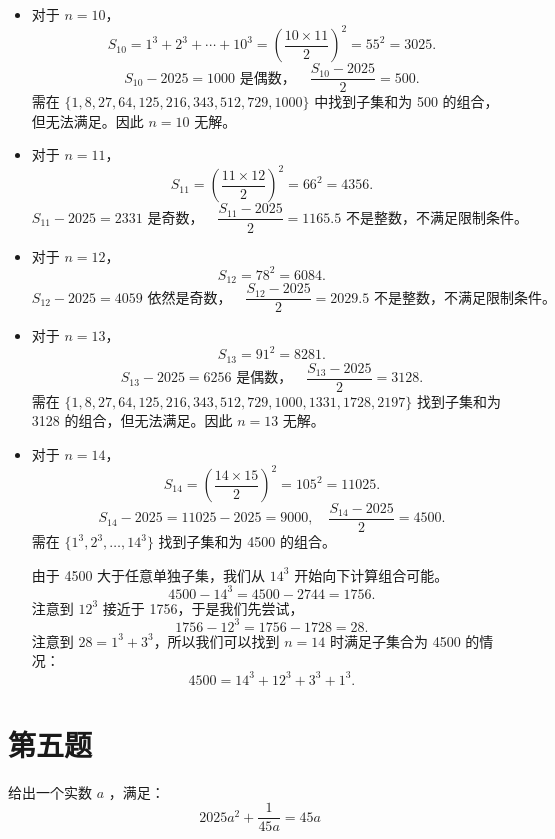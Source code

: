 \documentclass[12pt, a4paper]{article}
\theoremstyle{definition}
\theoremstyle{remark}
\begin{document}
\begin{itemize}
    \item 对于 $n = 10$，
    $$
    S_{10} = 1^3 + 2^3 + \cdots + 10^3 = \left( \frac{10 \times 11}{2} \right)^2 = 55^2 = 3025.
    $$
    $$
    S_{10} - 2025 = 1000 \text{ 是偶数，} \quad \frac{S_{10} - 2025}{2} = 500.
    $$
    需在 $\{1, 8, 27, 64, 125, 216, 343, 512, 729, 1000\}$ 中找到子集和为 500 的组合，但无法满足。因此 $n = 10$ 无解。

    \item 对于 $n = 11$，
    $$
    S_{11} = \left( \frac{11 \times 12}{2} \right)^2 = 66^2 = 4356.
    $$
    $$
    S_{11} - 2025 = 2331 \text{ 是奇数，} \quad \frac{S_{11} - 2025}{2} = 1165.5 \text{ 不是整数，不满足限制条件。}
    $$

    \item 对于 $n = 12$，
    $$
    S_{12} = 78^2 = 6084.
    $$
    $$
    S_{12} - 2025 = 4059 \text{ 依然是奇数，} \quad \frac{S_{12} - 2025}{2} = 2029.5 \text{ 不是整数，不满足限制条件。}
    $$

    \item 对于 $n = 13$，
    $$
    S_{13} = 91^2 = 8281.
    $$
    $$
    S_{13} - 2025 = 6256 \text{ 是偶数，} \quad \frac{S_{13} - 2025}{2} = 3128.
    $$
    需在 $\{1, 8, 27, 64, 125, 216, 343, 512, 729, 1000, 1331, 1728, 2197\}$ 找到子集和为 3128 的组合，但无法满足。因此 $n = 13$ 无解。

    \item 对于 $n=14$，
    $$
    S_{14}=\left(\frac{14 \times 15}{2}\right)^2=105^2=11025.
    $$
    $$
    S_{14} - 2025 = 11025 - 2025 = 9000, \quad \frac{S_{14} - 2025}{2} = 4500.
    $$
    需在 $\{1^3, 2^3, \ldots, 14^3\}$ 找到子集和为 4500 的组合。

    \noindent 由于 4500 大于任意单独子集，我们从 $14^3$ 开始向下计算组合可能。
    $$
    4500 - 14^3 = 4500 - 2744 = 1756.
    $$
    注意到 $12^3$ 接近于 1756，于是我们先尝试，
    $$
    1756 - 12^3 = 1756 - 1728 = 28.
    $$
    注意到 $28 = 1^3 + 3^3$，所以我们可以找到 $n = 14$ 时满足子集合为 4500 的情况：
    $$
    4500 = 14^3 + 12^3 + 3^3 + 1^3.
    $$
\end{itemize}


\newpage

\section{第五题}

\noindent 给出一个实数 \(a\) ，满足：
\[
2025a^2 + \frac{1}{45a} = 45a
\]
\end{document}
